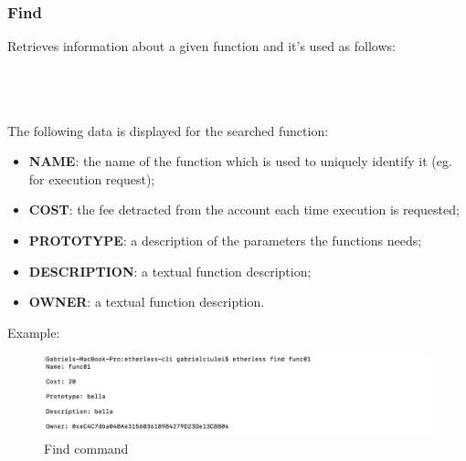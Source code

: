 \subsubsection{Find}
Retrieves information about a given function and it's used as follows:\\\\
\centerline {}\\\\
The following data is displayed for the searched function:
\begin{itemize}
	\item \textbf{NAME}: the name of the function which is used to uniquely identify it (eg. for execution request);
	\item \textbf{COST}: the fee detracted from the account each time execution is requested;
	\item \textbf{PROTOTYPE}: a description of the parameters the functions needs;
	\item \textbf{DESCRIPTION}: a textual function description;
	\item \textbf{OWNER}: a textual function description.
\end{itemize}
Example:
\begin{figure}[h]
	\begin{center}
	\includegraphics[width=\textwidth]{res/img/find.png}
	\caption{Find command}
	\end{center}
\end{figure}

